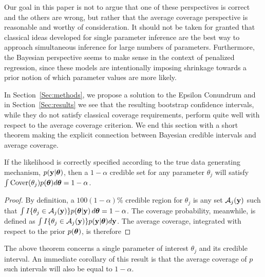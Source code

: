 Our goal in this paper is not to argue that one of these perspectives is correct and the others are wrong, but rather that the average coverage perspective is reasonable and worthy of consideration. It should not be taken for granted that classical ideas developed for single parameter inference are the best way to approach simultaneous inference for large numbers of parameters. Furthermore, the Bayesian perspective seems to make sense in the context of penalized regression, since these models are intentionally imposing shrinkage towards a prior notion of which parameter values are more likely.

In Section~\ref{Sec:methods}, we propose a solution to the Epsilon Conundrum and in Section~\ref{Sec:results} we see that the resulting bootstrap confidence intervals, while they do not satisfy classical coverage requirements, perform quite well with respect to the average coverage criterion. We end this section with a short theorem making the explicit connection between Bayesian credible intervals and average coverage.

\begin{thm}
  \label{Thm:bcc}
  If the likelihood is correctly specified according to the true data generating mechanism, $p(\mathbf{y} | \boldsymbol{\theta})$, then a $1-\alpha$ credible set for any parameter $\theta_j$ will satisfy $\int \textrm{Cover}(\theta_j)p(\boldsymbol{\theta}) d\boldsymbol{\theta} = 1 - \alpha$.
\end{thm}

\begin{proof}
By definition, a $100(1-\alpha)\%$ credible region for $\theta_j$ is any set $\mathcal{A}_j(\mathbf{y})$ such that $\int I\{\theta_j \in \mathcal{A}_j(\mathbf{y})\} p(\boldsymbol{\theta}|\mathbf{y})\,d\boldsymbol{\theta} = 1 - \alpha$. The coverage probability, meanwhile, is defined as $\int I\{\theta_j \in \mathcal{A}_j(\mathbf{y})\} p(\mathbf{y} | \boldsymbol{\theta})d\mathbf{y}$. The average coverage, integrated with respect to the prior $p(\boldsymbol{\theta})$, is therefore


\end{proof}

The above theorem concerns a single parameter of interest $\theta_j$ and its credible interval. An immediate corollary of this result is that the average coverage of $p$ such intervals will also be equal to $1-\alpha$.

